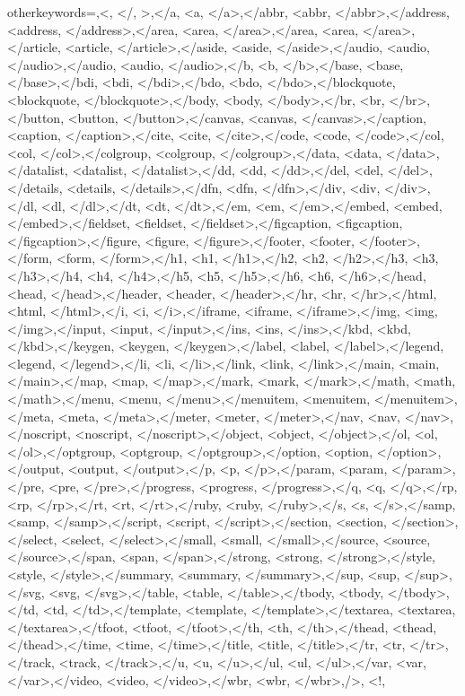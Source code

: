 {    %
    otherkeywords={\/,<, </, >,</a, <a, </a>,</abbr, <abbr, </abbr>,</address, <address, </address>,</area, <area, </area>,</area, <area, </area>,</article, <article, </article>,</aside, <aside, </aside>,</audio, <audio, </audio>,</audio, <audio, </audio>,</b, <b, </b>,</base, <base, </base>,</bdi, <bdi, </bdi>,</bdo, <bdo, </bdo>,</blockquote, <blockquote, </blockquote>,</body, <body, </body>,</br, <br, </br>,</button, <button, </button>,</canvas, <canvas, </canvas>,</caption, <caption, </caption>,</cite, <cite, </cite>,</code, <code, </code>,</col, <col, </col>,</colgroup, <colgroup, </colgroup>,</data, <data, </data>,</datalist, <datalist, </datalist>,</dd, <dd, </dd>,</del, <del, </del>,</details, <details, </details>,</dfn, <dfn, </dfn>,</div, <div, </div>,</dl, <dl, </dl>,</dt, <dt, </dt>,</em, <em, </em>,</embed, <embed, </embed>,</fieldset, <fieldset, </fieldset>,</figcaption, <figcaption, </figcaption>,</figure, <figure, </figure>,</footer, <footer, </footer>,</form, <form, </form>,</h1, <h1, </h1>,</h2, <h2, </h2>,</h3, <h3, </h3>,</h4, <h4, </h4>,</h5, <h5, </h5>,</h6, <h6, </h6>,</head, <head, </head>,</header, <header, </header>,</hr, <hr, </hr>,</html, <html, </html>,</i, <i, </i>,</iframe, <iframe, </iframe>,</img, <img, </img>,</input, <input, </input>,</ins, <ins, </ins>,</kbd, <kbd, </kbd>,</keygen, <keygen, </keygen>,</label, <label, </label>,</legend, <legend, </legend>,</li, <li, </li>,</link, <link, </link>,</main, <main, </main>,</map, <map, </map>,</mark, <mark, </mark>,</math, <math, </math>,</menu, <menu, </menu>,</menuitem, <menuitem, </menuitem>,</meta, <meta, </meta>,</meter, <meter, </meter>,</nav, <nav, </nav>,</noscript, <noscript, </noscript>,</object, <object, </object>,</ol, <ol, </ol>,</optgroup, <optgroup, </optgroup>,</option, <option, </option>,</output, <output, </output>,</p, <p, </p>,</param, <param, </param>,</pre, <pre, </pre>,</progress, <progress, </progress>,</q, <q, </q>,</rp, <rp, </rp>,</rt, <rt, </rt>,</ruby, <ruby, </ruby>,</s, <s, </s>,</samp, <samp, </samp>,</script, <script, </script>,</section, <section, </section>,</select, <select, </select>,</small, <small, </small>,</source, <source, </source>,</span, <span, </span>,</strong, <strong, </strong>,</style, <style, </style>,</summary, <summary, </summary>,</sup, <sup, </sup>,</svg, <svg, </svg>,</table, <table, </table>,</tbody, <tbody, </tbody>,</td, <td, </td>,</template, <template, </template>,</textarea, <textarea, </textarea>,</tfoot, <tfoot, </tfoot>,</th, <th, </th>,</thead, <thead, </thead>,</time, <time, </time>,</title, <title, </title>,</tr, <tr, </tr>,</track, <track, </track>,</u, <u, </u>,</ul, <ul, </ul>,</var, <var, </var>,</video, <video, </video>,</wbr, <wbr, </wbr>,/>, <!},
}
